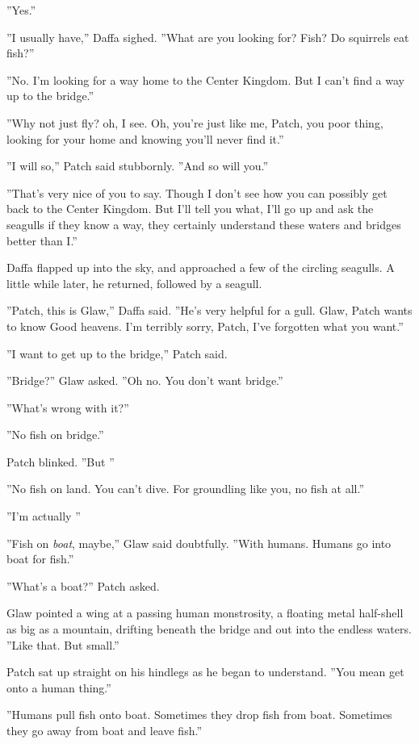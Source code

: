 \documentclass[11pt]{article}
\begin{document}
 ''Yes.''\par
 ''I usually have,'' Daffa sighed. ''What are you looking for? Fish? Do squirrels eat fish?''\par
 ''No. I'm looking for a way home to the Center Kingdom. But I can't find a way up to the bridge.''\par
 ''Why not just fly? %
 oh, I see. Oh, you're just like me, Patch, you poor thing, looking for your home and knowing you'll never find it.''\par
 ''I will so,'' Patch said stubbornly. ''And so will you.''\par
 ''That's very nice of you to say. Though I don't see how you can possibly get back to the Center Kingdom. But I'll tell you what, I'll go up and ask the seagulls if they know a way, they certainly understand these waters and bridges better than I.''\par
 Daffa flapped up into the sky, and approached a few of the circling seagulls. A little while later, he returned, followed by a seagull.\par
 ''Patch, this is Glaw,'' Daffa said. ''He's very helpful for a gull. Glaw, Patch wants to know%
Good heavens. I'm terribly sorry, Patch, I've forgotten what you want.''\par
 ''I want to get up to the bridge,'' Patch said.\par
 ''Bridge?'' Glaw asked. ''Oh no. You don't want bridge.''\par
''What's wrong with it?''\par
''No fish on bridge.''\par
 Patch blinked. ''But %
''\par
 ''No fish on land. You can't dive. For groundling like you, no fish at all.''\par
 ''I'm actually %
''\par
 ''Fish on {\it boat}, maybe,'' Glaw said doubtfully. ''With humans. Humans go into boat for fish.''\par
 ''What's a boat?'' Patch asked.\par
 Glaw pointed a wing at a passing human monstrosity, a floating metal half-shell as big as a mountain, drifting beneath the bridge and out into the endless waters. ''Like that. But small.''\par
 Patch sat up straight on his hindlegs as he began to understand. ''You mean get onto a human thing.''\par
 ''Humans pull fish onto boat. Sometimes they drop fish from boat. Sometimes they go away from boat and leave fish.''\par
\end{document}
